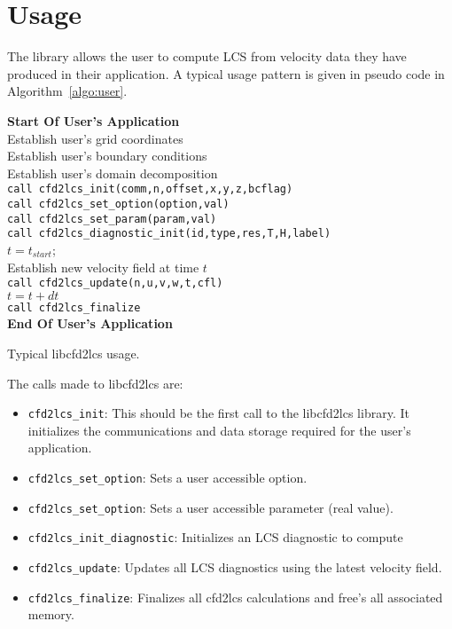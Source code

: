\documentclass[letterpaper,11pt]{article}
\begin{document}
\section{Usage}
The library allows the user to compute LCS from velocity data they have produced in their application.  A typical usage pattern is given in pseudo code in Algorithm~\ref{algo:user}.
\begin{algorithm}[!htbp!]
\DontPrintSemicolon 
{\bf Start Of User's Application}\\
Establish user's grid coordinates \\
Establish user's boundary conditions\\
Establish user's domain decomposition\\
\verb|call cfd2lcs_init(comm,n,offset,x,y,z,bcflag)|\\
\verb|call cfd2lcs_set_option(option,val)| \\
\verb|call cfd2lcs_set_param(param,val)| \\ 
\verb|call cfd2lcs_diagnostic_init(id,type,res,T,H,label)| \\
$t=t_{start}$;\\
 {
Establish new velocity field at time $t$\\
\texttt{call cfd2lcs\_update(n,u,v,w,t,cfl)}\\
$t = t+dt$\\
}
\verb|call cfd2lcs_finalize| \\
{\bf End Of User's Application}
\caption{Typical libcfd2lcs usage.}
\label{algo:user}
\end{algorithm}

The calls made to libcfd2lcs are:
\begin{itemize}
 \item \verb|cfd2lcs_init|:  This should be the first call to the libcfd2lcs library.  It initializes the communications and data storage required for the user's application.
 \item \verb|cfd2lcs_set_option|: Sets a user accessible option.
 \item \verb|cfd2lcs_set_option|: Sets a user accessible parameter (real value).
 \item \verb|cfd2lcs_init_diagnostic|:  Initializes an LCS diagnostic to compute
 \item \verb|cfd2lcs_update|:  Updates all LCS diagnostics using the latest velocity field.
 \item \verb|cfd2lcs_finalize|:  Finalizes all cfd2lcs calculations and free's all associated memory.
\end{itemize}
\end{document}

